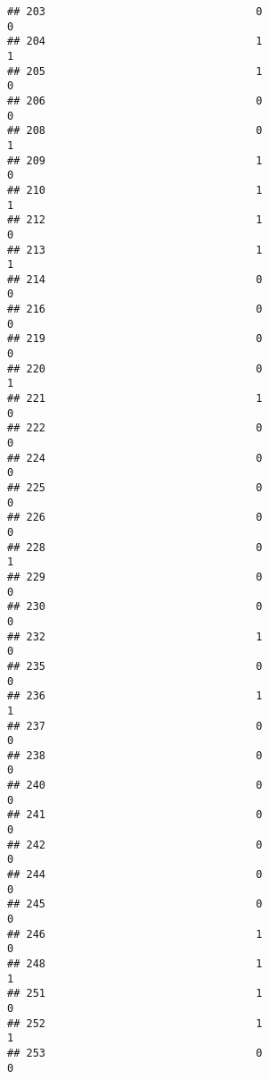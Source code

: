 \documentclass[
]{article}
\begin{document}
\begin{verbatim}
## 203                                 0                                0
## 204                                 1                                1
## 205                                 1                                0
## 206                                 0                                0
## 208                                 0                                1
## 209                                 1                                0
## 210                                 1                                1
## 212                                 1                                0
## 213                                 1                                1
## 214                                 0                                0
## 216                                 0                                0
## 219                                 0                                0
## 220                                 0                                1
## 221                                 1                                0
## 222                                 0                                0
## 224                                 0                                0
## 225                                 0                                0
## 226                                 0                                0
## 228                                 0                                1
## 229                                 0                                0
## 230                                 0                                0
## 232                                 1                                0
## 235                                 0                                0
## 236                                 1                                1
## 237                                 0                                0
## 238                                 0                                0
## 240                                 0                                0
## 241                                 0                                0
## 242                                 0                                0
## 244                                 0                                0
## 245                                 0                                0
## 246                                 1                                0
## 248                                 1                                1
## 251                                 1                                0
## 252                                 1                                1
## 253                                 0                                0

\end{verbatim}
\end{document}
